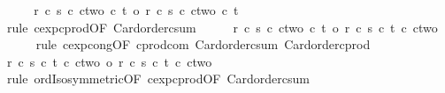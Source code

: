 \begin{isabellebody}
\ \ \isamarkupfalse%
\ \isamarkupfalse%
\ {\isachardoublequoteopen}{\isacharparenleft}{\kern0pt}{\isacharparenleft}{\kern0pt}r\ {\isacharplus}{\kern0pt}c\ s{\isacharparenright}{\kern0pt}\ {\isacharcircum}{\kern0pt}c\ ctwo{\isacharparenright}{\kern0pt}\ {\isacharcircum}{\kern0pt}c\ t\ {\isacharequal}{\kern0pt}o\ {\isacharparenleft}{\kern0pt}r\ {\isacharplus}{\kern0pt}c\ s{\isacharparenright}{\kern0pt}\ {\isacharcircum}{\kern0pt}c\ {\isacharparenleft}{\kern0pt}ctwo\ {\isacharasterisk}{\kern0pt}c\ t{\isacharparenright}{\kern0pt}{\isachardoublequoteclose}\isanewline
\ \ \ \ \isamarkupfalse%
\ {\isacharparenleft}{\kern0pt}rule\ cexp{\isacharunderscore}{\kern0pt}cprod{\isacharbrackleft}{\kern0pt}OF\ Card{\isacharunderscore}{\kern0pt}order{\isacharunderscore}{\kern0pt}csum{\isacharbrackright}{\kern0pt}{\isacharparenright}{\kern0pt}\isanewline
\ \ \isamarkupfalse%
\ \isamarkupfalse%
\ {\isachardoublequoteopen}{\isacharparenleft}{\kern0pt}r\ {\isacharplus}{\kern0pt}c\ s{\isacharparenright}{\kern0pt}\ {\isacharcircum}{\kern0pt}c\ {\isacharparenleft}{\kern0pt}ctwo\ {\isacharasterisk}{\kern0pt}c\ t{\isacharparenright}{\kern0pt}\ {\isacharequal}{\kern0pt}o\ {\isacharparenleft}{\kern0pt}r\ {\isacharplus}{\kern0pt}c\ s{\isacharparenright}{\kern0pt}\ {\isacharcircum}{\kern0pt}c\ {\isacharparenleft}{\kern0pt}t\ {\isacharasterisk}{\kern0pt}c\ ctwo{\isacharparenright}{\kern0pt}{\isachardoublequoteclose}\isanewline
\ \ \ \ \isamarkupfalse%
\ {\isacharparenleft}{\kern0pt}rule\ cexp{\isacharunderscore}{\kern0pt}cong{}{\isacharbrackleft}{\kern0pt}OF\ cprod{\isacharunderscore}{\kern0pt}com\ Card{\isacharunderscore}{\kern0pt}order{\isacharunderscore}{\kern0pt}csum\ Card{\isacharunderscore}{\kern0pt}order{\isacharunderscore}{\kern0pt}cprod{\isacharbrackright}{\kern0pt}{\isacharparenright}{\kern0pt}\isanewline
\ \ \isamarkupfalse%
\ \isamarkupfalse%
\ {\isachardoublequoteopen}{\isacharparenleft}{\kern0pt}r\ {\isacharplus}{\kern0pt}c\ s{\isacharparenright}{\kern0pt}\ {\isacharcircum}{\kern0pt}c\ {\isacharparenleft}{\kern0pt}t\ {\isacharasterisk}{\kern0pt}c\ ctwo{\isacharparenright}{\kern0pt}\ {\isacharequal}{\kern0pt}o\ {\isacharparenleft}{\kern0pt}{\isacharparenleft}{\kern0pt}r\ {\isacharplus}{\kern0pt}c\ s{\isacharparenright}{\kern0pt}\ {\isacharcircum}{\kern0pt}c\ t{\isacharparenright}{\kern0pt}\ {\isacharcircum}{\kern0pt}c\ ctwo{\isachardoublequoteclose}\isanewline
\ \ \ \ \isamarkupfalse%
\ {\isacharparenleft}{\kern0pt}rule\ ordIso{\isacharunderscore}{\kern0pt}symmetric{\isacharbrackleft}{\kern0pt}OF\ cexp{\isacharunderscore}{\kern0pt}cprod{\isacharbrackleft}{\kern0pt}OF\ Card{\isacharunderscore}{\kern0pt}order{\isacharunderscore}{\kern0pt}csum{\isacharbrackright}{\kern0pt}{\isacharbrackright}{\kern0pt}{\isacharparenright}{\kern0pt}\isanewline

\end{isabellebody}
